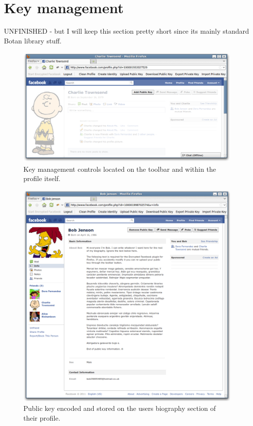 \FloatBarrier
\section{Key management}

UNFINISHED - but I will keep this section pretty short since its mainly standard Botan library stuff.

    \begin{figure}[tbph]
        \begin{center}
        
                \includegraphics[width=12cm]{screens/pubkey.png}

            \caption{Key management controls located on the toolbar and within the profile itself.}
            \label{scn:pubkey}
        \end{center}
    \end{figure}
    
        \begin{figure}[tbph]
        \begin{center}
        
                \includegraphics[width=12cm]{screens/bio.png}

            \caption{Public key encoded and stored on the users biography section of their profile.}
            \label{scn:bio}
        \end{center}
    \end{figure}

